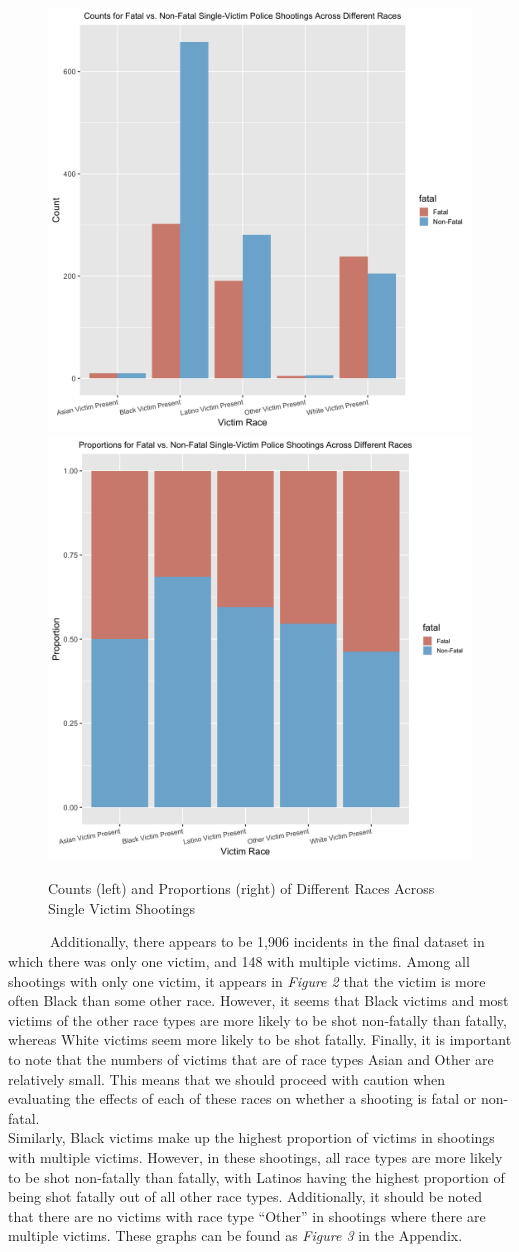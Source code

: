 \documentclass[
]{article}
\begin{document}
\begin{figure}
\includegraphics[width=0.5\linewidth]{figures/singleeda1} \includegraphics[width=0.5\linewidth]{figures/singleeda2} \caption{Counts (left) and Proportions (right) of Different Races Across Single Victim Shootings}\label{fig:figures-single}
\end{figure}

~~~~~~Additionally, there appears to be 1,906 incidents in the final
dataset in which there was only one victim, and 148 with multiple
victims. Among all shootings with only one victim, it appears in
\emph{Figure 2} that the victim is more often Black than some other
race. However, it seems that Black victims and most victims of the other
race types are more likely to be shot non-fatally than fatally, whereas
White victims seem more likely to be shot fatally. Finally, it is
important to note that the numbers of victims that are of race types
Asian and Other are relatively small. This means that we should proceed
with caution when evaluating the effects of each of these races on
whether a shooting is fatal or non-fatal.\\
\hspace*{0.333em}\hspace*{0.333em}\hspace*{0.333em}\hspace*{0.333em}\hspace*{0.333em}\hspace*{0.333em}Similarly,
Black victims make up the highest proportion of victims in shootings
with multiple victims. However, in these shootings, all race types are
more likely to be shot non-fatally than fatally, with Latinos having the
highest proportion of being shot fatally out of all other race types.
Additionally, it should be noted that there are no victims with race
type ``Other'' in shootings where there are multiple victims. These
graphs can be found as \emph{Figure 3} in the Appendix.
\end{document}
